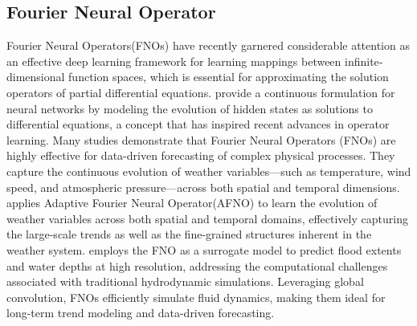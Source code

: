 \subsection{Fourier Neural Operator}
Fourier Neural Operators(FNOs) \cite{li2020ddtcdr} have recently garnered considerable attention as an effective deep learning framework for learning mappings between infinite‐dimensional function spaces, which is essential for approximating the solution operators of partial differential equations.
\citet{chen2019neuralordinarydifferentialequations} provide a continuous formulation for neural networks by modeling the evolution of hidden states as solutions to differential equations, a concept that has inspired recent advances in operator learning.
Many studies demonstrate that Fourier Neural Operators (FNOs) are highly effective for data-driven forecasting of complex physical processes. They capture the continuous evolution of weather variables—such as temperature, wind speed, and atmospheric pressure—across both spatial and temporal dimensions. \citet{pathak2022fourcastnet} applies Adaptive Fourier Neural Operator(AFNO) to learn the evolution of weather variables across both spatial and temporal domains, effectively capturing the large-scale trends as well as the fine-grained structures inherent in the weather system.
\citet{sun2023rapid} employs the FNO as a surrogate model to predict flood extents and water depths at high resolution, addressing the computational challenges associated with traditional hydrodynamic simulations. Leveraging global convolution, FNOs efficiently simulate fluid dynamics, making them ideal for long-term trend modeling and data-driven forecasting.


